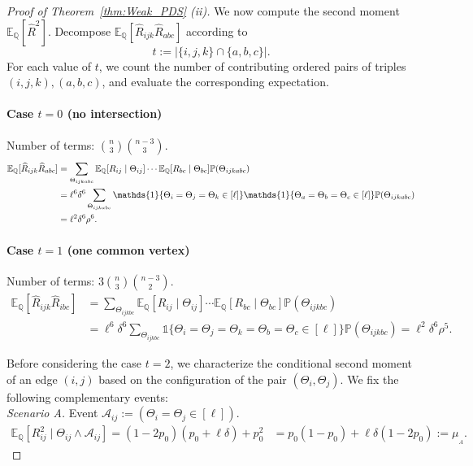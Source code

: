 \documentclass[11pt, letterpaper]{article}
\numberwithin{equation}{section}
\begin{document}
\begin{proof}[Proof of Theorem~\ref{thm:Weak_PDS} \textnormal{(ii)}]
\noindent We now compute the second moment $\mathbb{E}_{\mathbb Q}[\widehat{R}^2]$. 
Decompose $\mathbb{E}_{\mathbb Q}[\hat R_{ijk} \hat R_{abc}]$ according to 
\[
    t := |\{i,j,k\} \cap \{a,b,c\}|.
\]
For each value of $t$, we count the number of contributing ordered pairs of triples \((i,j,k), (a,b,c)\), and evaluate the corresponding expectation.

\paragraph*{Case $t=0$ (no intersection)} 
Number of terms: $\binom{n}{3}\binom{n-3}{3}$.
\begin{align}
    \notag\mathbb{E}_{\mathbb Q}[\widehat{R}_{ijk}\widehat{R}_{abc}] 
    &= \sum_{\Theta_{ijkabc}}\mathbb{E}_{\mathbb Q}[R_{ij} \mid \Theta_{ij}] \cdots\mathbb{E}_{\mathbb Q}[R_{bc} \mid \Theta_{bc}]\mathbb P(\Theta_{ijkabc})\\
    \notag &= \ell^6\delta^6 \sum_{\Theta_{ijkabc}}
    \notag \mathds{1}\{\Theta_i = \Theta_j = \Theta_k \in [\ell]\}
    \notag\mathds{1}\{\Theta_a = \Theta_b = \Theta_c \in [\ell]\}
    \notag \mathbb P(\Theta_{ijkabc})\\
    \notag &= \ell^{2}\delta^6\rho^6.
\end{align}

\paragraph*{Case $t = 1$ (one common vertex)}
Number of terms: $3 \binom{n}{3}\binom{n-3}{2}$.
\begin{align*}
   \mathbb{E}_{\mathbb Q}[\widehat{R}_{ijk}\widehat{R}_{ibc}] 
    &= \sum_{\Theta_{ijkbc}}\mathbb{E}_{\mathbb Q}[R_{ij} \mid \Theta_{ij}]  \cdots
    \mathbb E_\mathbb Q [R_{bc} \mid \Theta_{bc}]\mathbb P(\Theta_{ijkbc})\\
    &= \ell^6\delta^6 \sum_{\Theta_{ijkbc}}
    \mathds{1}\{\Theta_i = \Theta_j = \Theta_k = \Theta_b
    = \Theta_c \in [\ell]\}\mathbb P(\Theta_{ijkbc})= \ell^{2} \delta^6\rho^5.
\end{align*}

\noindent Before considering the case $t=2$, we characterize the conditional second moment of an edge $(i,j)$
based on the configuration of the pair \((\Theta_i, \Theta_j)\). We fix the following complementary events:\\

\noindent \emph{Scenario A.} Event \(\mathcal{A}_{ij} := (\Theta_i=\Theta_j \in [\ell]).\)
\begin{align*}
\mathbb{E}_{\mathbb Q}[R_{ij}^2 \mid \Theta_{ij} \wedge \mathcal{A}_{ij}]
= (1-2p_0)(p_0+\ell\delta)+p_0^2
&= p_0(1-p_0)+\ell\delta(1-2p_0):= \mu_{_A}.
\end{align*}


\end{proof}
\end{document}
